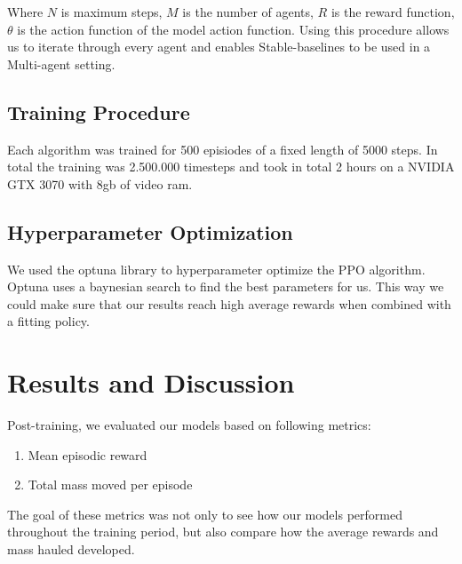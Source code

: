 \documentclass[conference]{IEEEtran}
\begin{document}
	Where $N$ is maximum steps, $M$ is the number of agents, $R$ is the reward function, $\theta$ is the action function of the model action function.
	Using this procedure allows us to iterate through every agent and enables Stable-baselines to be used in a Multi-agent setting.


	\subsection{Training Procedure}
	Each algorithm was trained for 500 episiodes of a fixed length of 5000 steps. In total the training was
	2.500.000 timesteps and took in total 2 hours on a NVIDIA GTX 3070 with 8gb of video ram.


	\subsection{Hyperparameter Optimization}
	We used the optuna library to hyperparameter optimize the PPO algorithm. Optuna uses a baynesian
	search to find the best parameters for us. This way we could make sure that our results reach high
	average rewards when combined with a fitting policy.



	\section{Results and Discussion}
	Post-training, we evaluated our models based on following metrics:

	\begin{enumerate}
		\item Mean episodic reward
		\item Total mass moved per episode
	\end{enumerate}

	The goal of these metrics was not only to see how our models performed throughout the training period, but also compare how the average rewards and mass hauled developed.
\end{document}
